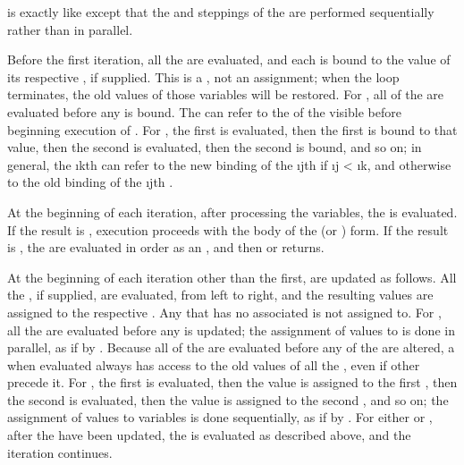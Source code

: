  is exactly like  
except that the  and steppings
of the  are performed sequentially rather than in parallel.



Before the first iteration, all the  are evaluated, and
each  is bound to the value of its respective ,
if supplied.
This is a , not an assignment; when the loop terminates,
the old values of those variables will be restored.
For , all 
of the  are evaluated before any 
is bound. The
 can refer to the  of the 
visible before beginning execution of
.
For , the first  is evaluated, then the first
 is bound to that value, then the second  
is evaluated, then the second  is bound, and so on;
in general, the \i{k}th  can refer to the new binding 
of the \i{j}th  if \i{j} < \i{k}, and otherwise to the 
old binding of the \i{j}th .

At the beginning of each iteration, after processing the variables,
the  is evaluated.  If the result is
, execution proceeds with the body of the  
(or ) form.
If the result is , the  are evaluated in order
as an ,
and then  or  returns.  

At the beginning of each iteration other than the first, 
 are updated as follows.  All the , if supplied,
are evaluated, from left to right, and the resulting values are
assigned to the respective .
Any  that has no associated  is not assigned to.
For , all the  are evaluated before any 
is updated; the assignment of values to  is done in parallel,
as if by .
Because all of the  are evaluated before any
of the  are altered, a  when evaluated always has
access to the old values of all the , even if other 
precede it.
For , the first  is evaluated, then the
value is assigned to the first , then the second  
is evaluated, then the value is assigned to the second , and so on;
the assignment of values to variables is done sequentially,
as if by .
For either  or ,
after the  have been updated,
the  
is evaluated as described above, and the iteration continues.



